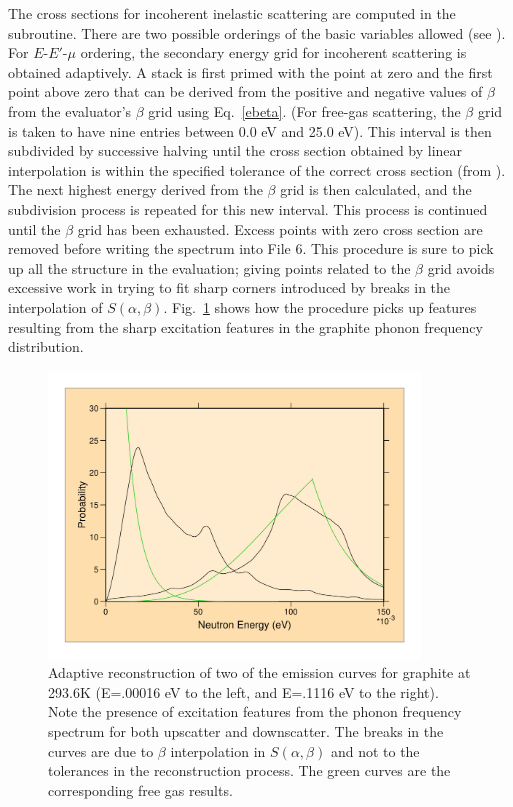 The cross sections for incoherent inelastic scattering are computed
in the  subroutine.  There
are two possible orderings of the basic variables allowed (see
).  For $E$-$E'$-$\mu$ ordering, the secondary energy grid
for incoherent scattering is obtained adaptively.  A stack is first primed
with the point at zero and the first point above zero that can be derived
from the positive and negative values of $\beta$ from the evaluator's
$\beta$ grid using Eq.~\ref{ebeta}.  (For free-gas scattering, the
$\beta$ grid is taken to have nine entries between 0.0 eV and 25.0 eV).
This interval is then subdivided by successive halving until the
cross section obtained by linear interpolation is within the specified
tolerance of the correct cross section (from
). The next
highest energy derived from the $\beta$ grid is then calculated,
and the subdivision process is repeated for this new interval.
This process is continued until the $\beta$ grid has been exhausted.
Excess points with zero cross section are removed before writing
the spectrum into File 6.  This procedure is sure to pick up all the
structure in the evaluation; giving points related to the $\beta$
grid avoids excessive work in trying to fit sharp corners introduced by
breaks in the interpolation of $S(\alpha,\beta)$.  Fig.~\ref{graph}
shows how the procedure picks up features resulting from the sharp
excitation features in the graphite phonon frequency distribution.

\begin{figure}[thb]\centering
\includegraphics[keepaspectratio, height=3.0in, angle=0]{figs/thermr2ack}
  \caption[Adaptive reconstruction of emission spectra (graphite)]{Adaptive
 reconstruction of two of the emission curves for graphite at 293.6K
 (E=.00016 eV to the left, and E=.1116 eV to the right).  Note the
 presence of excitation features from the phonon frequency spectrum
 for both upscatter and downscatter.  The breaks in the curves are due
 to $\beta$ interpolation in $S(\alpha,\beta)$ and not to the tolerances
 in the reconstruction process.  The green curves are the corresponding
 free gas results.}
\label{graph}
\end{figure}

